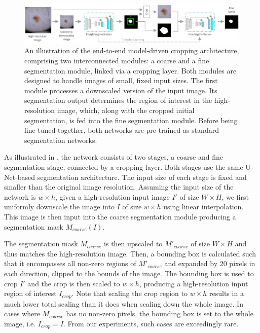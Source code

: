 \begin{figure}[h]
\includegraphics[width=\textwidth]{images/5/e2e/diagram.pdf}
\caption{An illustration of the end-to-end model-driven cropping architecture, comprising two interconnected modules: a coarse and a fine segmentation module, linked via a cropping layer. Both modules are designed to handle images of small, fixed input sizes. The first module processes a downscaled version of the input image. Its segmentation output determines the region of interest in the high-resolution image, which, along with the cropped initial segmentation, is fed into the fine segmentation module. Before being fine-tuned together, both networks are pre-trained as standard segmentation networks.\label{fig:e2e-diagram}}\end{figure}

As illustrated in , the network consists of two stages, a coarse and fine segmentation stage, connected by a cropping layer. Both stages use the same U-Net-based segmentation architecture. The input size of each stage is fixed and smaller than the original image resolution. Assuming the input size of the network is $w \times h$, given a high-resolution input image $I'$ of size $W \times H$, we first uniformly downscale the image into $I$ of size $w \times h$ using linear interpolation. This image is then input into the coarse segmentation module producing a segmentation mask $M_{coarse}(I)$.

The segmentation mask $M_{coarse}$ is then upscaled to $M'_{coarse}$ of size $W \times H$ and thus matches the high-resolution image. Then, a bounding box is calculated such that it encompasses all non-zero regions of $M'_{coarse}$ and expanded by 20 pixels in each direction, clipped to the bounds of the image. The bounding box is used to crop $I'$ and the crop is then scaled to $w \times h$, producing a high-resolution input region of interest $I_{crop}$. Note that scaling the crop region to $w \times h$ results in a much lower total scaling than it does when scaling down the whole image. In cases where $M_{coarse}$ has no non-zero pixels, the bounding box is set to the whole image, i.e. $I_{crop} = I$. From our experiments, such cases are exceedingly rare.

